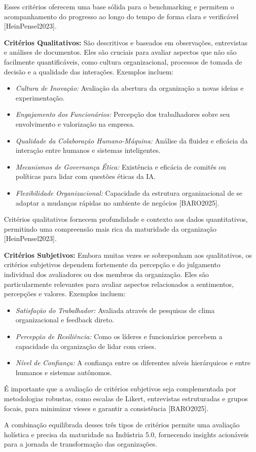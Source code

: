 Esses critérios oferecem uma base sólida para o benchmarking e permitem o acompanhamento do progresso ao longo do tempo de forma clara e verificável [HeinPensel2023].

\textbf{Critérios Qualitativos:}
São descritivos e baseados em observações, entrevistas e análises de documentos. Eles são cruciais para avaliar aspectos que não são facilmente quantificáveis, como cultura organizacional, processos de tomada de decisão e a qualidade das interações. Exemplos incluem:
\begin{itemize}
    \item \textit{Cultura de Inovação:} Avaliação da abertura da organização a novas ideias e experimentação.
    \item \textit{Engajamento dos Funcionários:} Percepção dos trabalhadores sobre seu envolvimento e valorização na empresa.
    \item \textit{Qualidade da Colaboração Humano-Máquina:} Análise da fluidez e eficácia da interação entre humanos e sistemas inteligentes.
    \item \textit{Mecanismos de Governança Ética:} Existência e eficácia de comitês ou políticas para lidar com questões éticas da IA.
    \item \textit{Flexibilidade Organizacional:} Capacidade da estrutura organizacional de se adaptar a mudanças rápidas no ambiente de negócios [BARO2025].
\end{itemize}

Critérios qualitativos fornecem profundidade e contexto aos dados quantitativos, permitindo uma compreensão mais rica da maturidade da organização [HeinPensel2023].

\textbf{Critérios Subjetivos:}
Embora muitas vezes se sobreponham aos qualitativos, os critérios subjetivos dependem fortemente da percepção e do julgamento individual dos avaliadores ou dos membros da organização. Eles são particularmente relevantes para avaliar aspectos relacionados a sentimentos, percepções e valores. Exemplos incluem:
\begin{itemize}
    \item \textit{Satisfação do Trabalhador:} Avaliada através de pesquisas de clima organizacional e feedback direto.
    \item \textit{Percepção de Resiliência:} Como os líderes e funcionários percebem a capacidade da organização de lidar com crises.
    \item \textit{Nível de Confiança:} A confiança entre os diferentes níveis hierárquicos e entre humanos e sistemas autônomos.
\end{itemize}

É importante que a avaliação de critérios subjetivos seja complementada por metodologias robustas, como escalas de Likert, entrevistas estruturadas e grupos focais, para minimizar vieses e garantir a consistência [BARO2025].

A combinação equilibrada desses três tipos de critérios permite uma avaliação holística e precisa da maturidade na Indústria 5.0, fornecendo insights acionáveis para a jornada de transformação das organizações.

